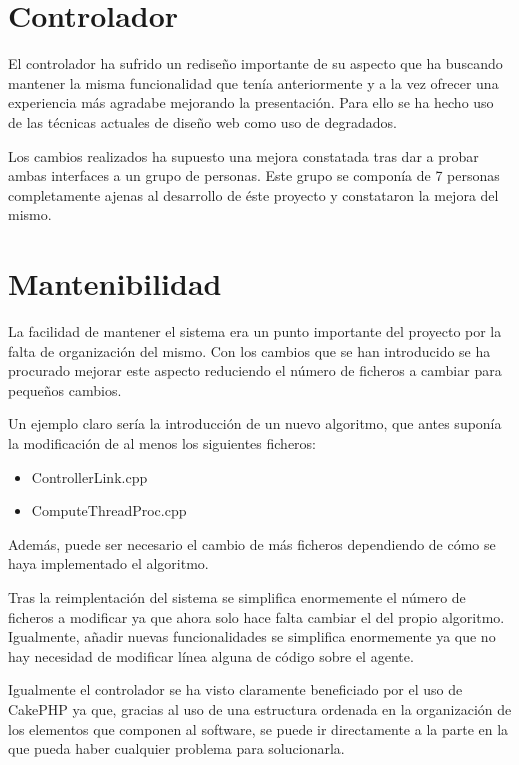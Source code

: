 \section{Controlador}

El controlador ha sufrido un rediseño importante de su aspecto que ha buscando mantener la misma funcionalidad que tenía anteriormente y a la vez ofrecer una experiencia más agradabe mejorando la presentación. Para ello se ha hecho uso de las técnicas actuales de diseño web como uso de degradados.

Los cambios realizados ha supuesto una mejora constatada tras dar a probar ambas interfaces a un grupo de personas. Este grupo se componía de 7 personas completamente ajenas al desarrollo de éste proyecto y constataron la mejora del mismo.

\section{Mantenibilidad}

La facilidad de mantener el sistema era un punto importante del proyecto por la falta de organización del mismo. Con los cambios que se han introducido se ha procurado mejorar este aspecto reduciendo el número de ficheros a cambiar para pequeños cambios.

Un ejemplo claro sería la introducción de un nuevo algoritmo, que antes suponía la modificación de al menos los siguientes ficheros:

\begin{itemize}
	\item ControllerLink.cpp
	\item ComputeThreadProc.cpp
\end{itemize}

Además, puede ser necesario el cambio de más ficheros dependiendo de cómo se haya implementado el algoritmo.

Tras la reimplentación del sistema se simplifica enormemente el número de ficheros a modificar ya que ahora solo hace falta cambiar el del propio algoritmo. Igualmente, añadir nuevas funcionalidades se simplifica enormemente ya que no hay necesidad de modificar línea alguna de código sobre el agente.

Igualmente el controlador se ha visto claramente beneficiado por el uso de CakePHP ya que, gracias al uso de una estructura ordenada en la organización de los elementos que componen al software, se puede ir directamente a la parte en la que pueda haber cualquier problema para solucionarla.